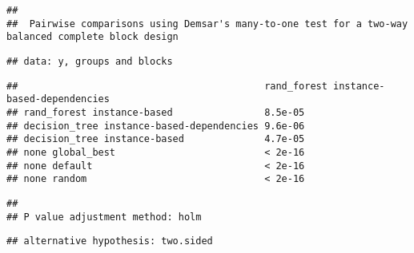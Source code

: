 \documentclass[
]{article}
\newenvironment{Shaded}{\begin{snugshade}}{\end{snugshade}}
\newcommand{\DataTypeTok}[1]{\textcolor[rgb]{0.13,0.29,0.53}{#1}}
\newcommand{\KeywordTok}[1]{\textcolor[rgb]{0.13,0.29,0.53}{\textbf{#1}}}
\newcommand{\NormalTok}[1]{#1}
\newcommand{\OperatorTok}[1]{\textcolor[rgb]{0.81,0.36,0.00}{\textbf{#1}}}
\newcommand{\StringTok}[1]{\textcolor[rgb]{0.31,0.60,0.02}{#1}}
\begin{document}
\begin{Shaded}
\end{Shaded}

\begin{verbatim}
## 
##  Pairwise comparisons using Demsar's many-to-one test for a two-way balanced complete block design
\end{verbatim}

\begin{verbatim}
## data: y, groups and blocks
\end{verbatim}

\begin{verbatim}
##                                           rand_forest instance-based-dependencies
## rand_forest instance-based                8.5e-05                                
## decision_tree instance-based-dependencies 9.6e-06                                
## decision_tree instance-based              4.7e-05                                
## none global_best                          < 2e-16                                
## none default                              < 2e-16                                
## none random                               < 2e-16
\end{verbatim}

\begin{verbatim}
## 
## P value adjustment method: holm
\end{verbatim}

\begin{verbatim}
## alternative hypothesis: two.sided
\end{verbatim}
\end{document}
